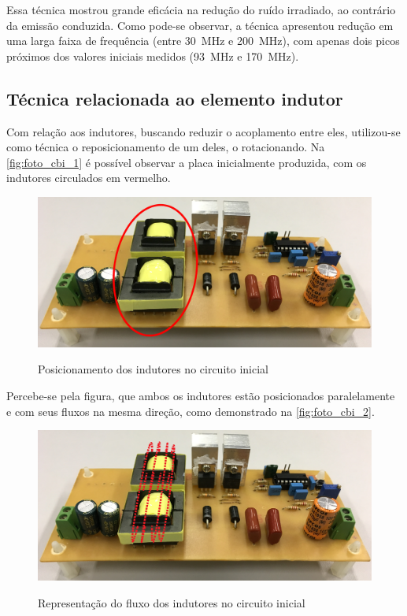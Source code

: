     Essa técnica mostrou grande eficácia na redução do ruído irradiado, ao contrário da emissão conduzida. Como pode-se observar, a técnica apresentou redução em uma larga faixa de frequência (entre \SI{30}{\mega\hertz} e \SI{200}{\mega\hertz}), com apenas dois picos próximos dos valores iniciais medidos (\SI{93}{\mega\hertz} e \SI{170}{\mega\hertz}).
    
    \subsection{Técnica relacionada ao elemento indutor} \label{cap:result_tecnicas_indut}
    
    Com relação aos indutores, buscando reduzir o acoplamento entre eles, utilizou-se como técnica o reposicionamento de um deles, o rotacionando. Na \autoref{fig:foto_cbi_1} é possível observar a placa inicialmente produzida, com os indutores circulados em vermelho. 
    
    \begin{figure}[H]
    	\centering
    	\caption{Posicionamento dos indutores no circuito inicial}
    	\includegraphics[scale=.1]{pdf/fotos/placa_vista_lateral_sel.jpg}
        \label{fig:foto_cbi_1}
    \end{figure}
    
    Percebe-se pela figura, que ambos os indutores estão posicionados paralelamente e com seus fluxos na mesma direção, como demonstrado na \autoref{fig:foto_cbi_2}.
    
    \begin{figure}[H]
    	\centering
    	\caption{Representação do fluxo dos indutores no circuito inicial}
    	\includegraphics[scale=.1]{pdf/fotos/placa_vista_lateral_fluxo.jpg}
        \label{fig:foto_cbi_2}
    \end{figure}
    
